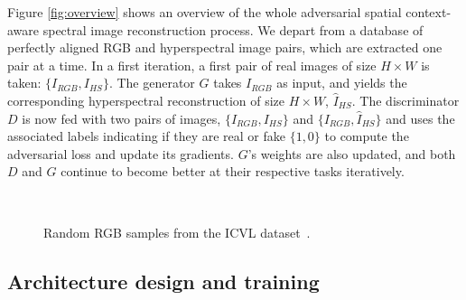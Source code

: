 \documentclass[10pt,twocolumn,letterpaper]{article}
\begin{document}
Figure \ref{fig:overview} shows an overview of the whole adversarial spatial context-aware spectral image reconstruction process. We depart from a database of perfectly aligned RGB and hyperspectral image pairs, which are extracted one pair at a time. In a first iteration, a first pair of real images of size $H\times W$ is taken: $\{I_{RGB}, I_{HS}\}$. The generator $G$ takes $I_{RGB}$ as input, and yields the corresponding hyperspectral reconstruction of size $H\times W$, $\hat{I}_{HS}$. The discriminator $D$ is now fed with two pairs of images, $\{I_{RGB}, I_{HS}\}$ and $\{I_{RGB}, \hat{I}_{HS}\}$ and uses the associated labels indicating if they are real or fake $\{1,0\}$ to compute the adversarial loss and update its gradients. $G$'s weights are also updated, and both $D$ and $G$ continue to become better at their respective tasks iteratively.

\begin{figure*}[!htbp]
	\centering     %
	\\
	\caption{Random RGB samples from the ICVL dataset~\cite{arad_sparse_2016}.}
	\label{fig:srgb_samples}
\end{figure*}

\subsection{Architecture design and training}
\label{sec:architecture}
\end{document}
